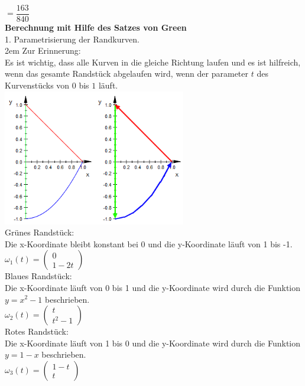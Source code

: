 \documentclass[11pt,final]{scrreprt}
\begin{document}
$ = \dfrac{163}{840}$\\


\textbf{Berechnung mit Hilfe des Satzes von Green}\\

1. Parametrisierung der Randkurven.\\

\begingroup
\leftskip2em 
Zur Erinnerung:\\
Es ist wichtig, dass alle Kurven in die gleiche Richtung laufen und es ist hilfreich, wenn das gesamte Randstück abgelaufen wird, wenn der parameter $t$ des Kurvenstücks von $0$ bis $1$ läuft.\\
\includegraphics[width=8cm]{images/flaechenintegral/a1Skizze5.png}\\

Grünes Randstück:\\
Die x-Koordinate bleibt konstant bei 0 und die y-Koordinate läuft von 1 bis -1.\\
$\omega_1(t) =  \left(\begin{matrix}
0\\1-2t
\end{matrix}\right) $\\

Blaues Randstück:\\
Die x-Koordinate läuft von 0 bis 1 und die y-Koordinate wird durch die Funktion $y=x^2-1$ beschrieben.\\
$\omega_2(t) = \left(\begin{matrix}
t\\t^2-1
\end{matrix}\right) $\\

Rotes Randstück:\\
Die x-Koordinate läuft von 1 bis 0 und die y-Koordinate wird durch die Funktion $y=1-x$ beschrieben.\\
$\omega_3(t) = \left(\begin{matrix}
1-t\\t
\end{matrix}\right)$\\
\end{document}
